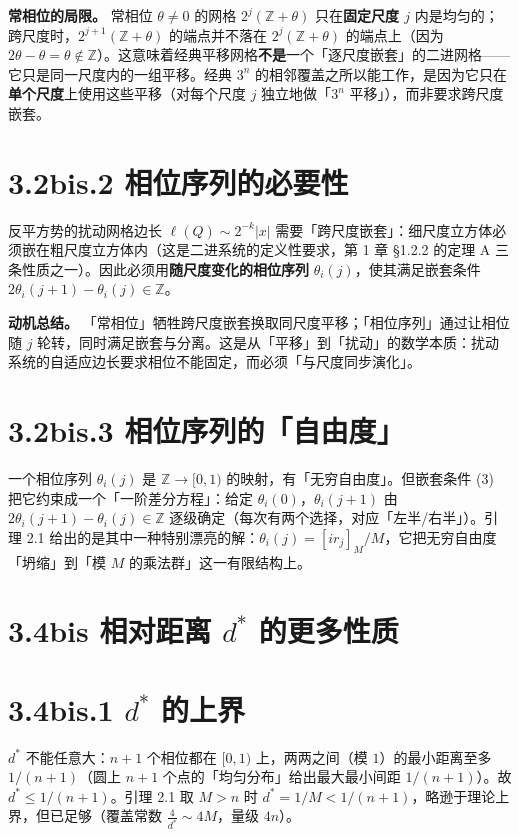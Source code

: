 \documentclass[a4paper,11pt,openany]{ctexbook}
\numberwithin{equation}{chapter}
\numberwithin{figure}{chapter}
\numberwithin{table}{chapter}
\begin{document}
\textbf{常相位的局限。} 常相位 $\theta\neq0$ 的网格 $2^j(\mathbb Z+\theta)$ 只在\textbf{固定尺度 $j$} 内是均匀的；跨尺度时，$2^{j+1}(\mathbb Z+\theta)$ 的端点并不落在 $2^j(\mathbb Z+\theta)$ 的端点上（因为 $2\theta-\theta=\theta\notin\mathbb Z$）。这意味着经典平移网格\textbf{不是}一个「逐尺度嵌套」的二进网格——它只是同一尺度内的一组平移。经典 $3^n$ 的相邻覆盖之所以能工作，是因为它只在\textbf{单个尺度}上使用这些平移（对每个尺度 $j$ 独立地做「$3^n$ 平移」），而非要求跨尺度嵌套。

\section{3.2bis.2 相位序列的必要性}

反平方势的扰动网格边长 $\ell(Q)\sim2^{-k}|x|$ 需要「跨尺度嵌套」：细尺度立方体必须嵌在粗尺度立方体内（这是二进系统的定义性要求，第 1 章 §1.2.2 的定理 A 三条性质之一）。因此必须用\textbf{随尺度变化的相位序列} $\theta_i(j)$，使其满足嵌套条件 $2\theta_i(j+1)-\theta_i(j)\in\mathbb Z$。

\textbf{动机总结。} 「常相位」牺牲跨尺度嵌套换取同尺度平移；「相位序列」通过让相位随 $j$ 轮转，同时满足嵌套与分离。这是从「平移」到「扰动」的数学本质：扰动系统的自适应边长要求相位不能固定，而必须「与尺度同步演化」。

\section{3.2bis.3 相位序列的「自由度」}

一个相位序列 $\theta_i(j)$ 是 $\mathbb Z\to[0,1)$ 的映射，有「无穷自由度」。但嵌套条件 (3) 把它约束成一个「一阶差分方程」：给定 $\theta_i(0)$，$\theta_i(j+1)$ 由 $2\theta_i(j+1)-\theta_i(j)\in\mathbb Z$ 逐级确定（每次有两个选择，对应「左半/右半」）。引理 2.1 给出的是其中一种特别漂亮的解：$\theta_i(j)=[ir_j]_M/M$，它把无穷自由度「坍缩」到「模 $M$ 的乘法群」这一有限结构上。

\section{3.4bis 相对距离 $d^*$ 的更多性质}

\section{3.4bis.1 $d^*$ 的上界}

$d^*$ 不能任意大：$n+1$ 个相位都在 $[0,1)$ 上，两两之间（模 $1$）的最小距离至多 $1/(n+1)$（圆上 $n+1$ 个点的「均匀分布」给出最大最小间距 $1/(n+1)$）。故 $d^*\le1/(n+1)$。引理 2.1 取 $M>n$ 时 $d^*=1/M<1/(n+1)$，略逊于理论上界，但已足够（覆盖常数 $\frac4{d^*}\sim4M$，量级 $4n$）。
\end{document}

